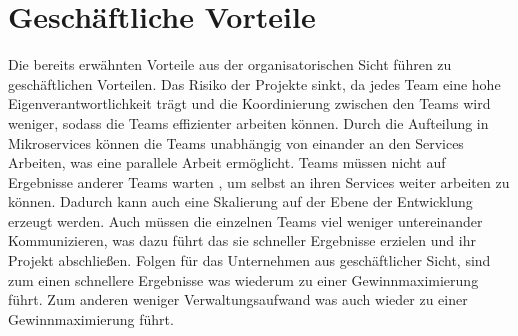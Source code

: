 \section{Geschäftliche Vorteile}

Die bereits erwähnten Vorteile aus der organisatorischen Sicht führen zu geschäftlichen Vorteilen. Das Risiko der Projekte sinkt, da jedes Team eine hohe Eigenverantwortlichkeit trägt und die Koordinierung zwischen den Teams wird weniger, sodass die Teams effizienter arbeiten können.
Durch die Aufteilung in Mikroservices können die Teams unabhängig von einander an den Services Arbeiten, was eine parallele Arbeit ermöglicht. Teams müssen nicht auf Ergebnisse anderer Teams warten , um selbst an ihren Services weiter arbeiten zu können. Dadurch kann auch eine Skalierung auf der Ebene der Entwicklung erzeugt werden. Auch müssen die einzelnen Teams viel weniger untereinander Kommunizieren, was dazu führt das sie schneller Ergebnisse erzielen und ihr Projekt abschließen.
Folgen für das Unternehmen aus geschäftlicher Sicht, sind zum einen schnellere Ergebnisse was wiederum zu einer Gewinnmaximierung führt. Zum anderen weniger Verwaltungsaufwand was auch wieder zu einer Gewinnmaximierung führt.\cite{microservices}
